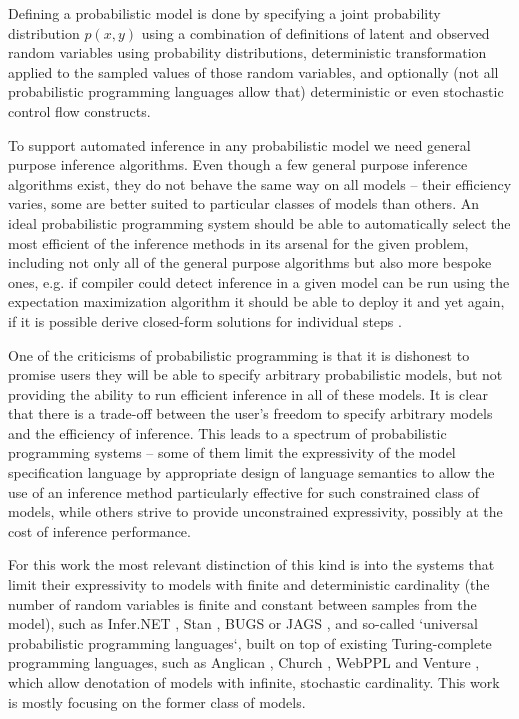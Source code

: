\documentclass[12pt]{article}
\begin{document}
Defining a probabilistic model is done by specifying a joint probability distribution $p(x,y)$ using a combination of 
definitions of latent and observed random variables using probability distributions, 
deterministic transformation applied to the sampled values of those random variables, 
and optionally (not all probabilistic programming languages 
allow that) 
deterministic or even stochastic control flow constructs.  

To support automated inference in any probabilistic model we need general purpose inference algorithms.
Even though a few general purpose inference algorithms exist, they do not behave the same way on all models -- their efficiency varies, some are better suited to particular classes of models than others.
An ideal probabilistic programming system should be able to automatically select the most efficient of the inference methods in its arsenal for the given problem, including not only all of the general purpose algorithms but also more bespoke ones, 
e.g. if compiler could detect inference in a given model can be run using the expectation maximization algorithm \citep{EM} it should be able to deploy it and yet again, if it is possible derive closed-form solutions for individual steps \citep{Zinkov2017}.

One of the criticisms of probabilistic programming is that it is dishonest to promise users they will be able to specify arbitrary probabilistic models, but not providing the ability to run efficient inference in all of these models.
It is clear that there is a trade-off between the user's freedom to specify arbitrary models and the efficiency of inference.
This leads to a spectrum of probabilistic programming systems -- some of them limit the expressivity of the model specification language by appropriate design of language semantics to allow the use of an inference method particularly effective for such constrained class of models, while others strive to provide unconstrained expressivity, possibly at the cost of inference performance.

For this work the most relevant distinction of this kind is into the systems that limit their expressivity to models with finite and deterministic cardinality (the number of random variables is finite and constant between samples from the model), such as Infer.NET \citep{InferNET}, Stan \citep{Stan}, BUGS \citep{WinBUGS,BUGSproject} or JAGS \citep{JAGS}, 
and so-called `universal probabilistic programming languages`, built on top of existing Turing-complete programming languages, such as Anglican \citep{anglican}, Church \citep{GoodmanEtAl2008}, WebPPL \citep{GoodmanStuhlmuller2014} and Venture \citep{venture},
which allow denotation of models with infinite, stochastic cardinality.
This work is mostly focusing on the former class of models.
\end{document}
